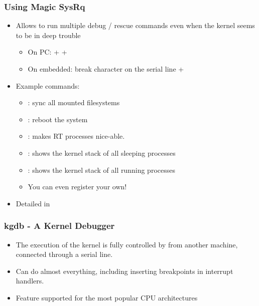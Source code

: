 \begin{frame}
  \frametitle{Using Magic SysRq}
  \begin{itemize}
  \item Allows to run multiple debug / rescue commands even when the
    kernel seems to be in deep trouble
    \begin{itemize}
    \item On PC: \code{[Alt]} + \code{[SysRq]} + 
    \item On embedded: break character on the serial line +
    \end{itemize}
  \item Example commands:
    \begin{itemize}
    \item {}: sync all mounted filesystems
    \item {}: reboot the system
    \item {}: makes RT processes nice-able.
    \item {}: shows the kernel stack of all sleeping processes
    \item {}: shows the kernel stack of all running processes
    \item You can even register your own!
    \end{itemize}
  \item Detailed in 
  \end{itemize}
\end{frame}

\begin{frame}
  \frametitle{kgdb - A Kernel Debugger}
  \begin{itemize}
  \item The execution of the kernel is fully controlled by 
    from another machine, connected through a serial line.
  \item Can do almost everything, including inserting breakpoints in
    interrupt handlers.
  \item Feature supported for the most popular CPU architectures
  \end{itemize}
\end{frame}

